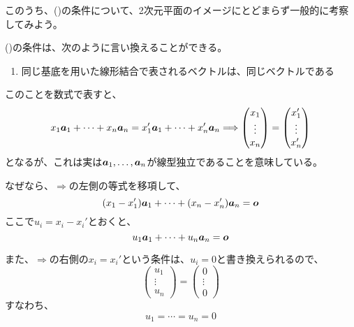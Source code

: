 \documentclass[../../../topic_linear-algebra]{subfiles}
\begin{document}
このうち、()の条件について、2次元平面のイメージにとどまらず一般的に考察してみよう。

\br

()の条件は、次のように言い換えることができる。

\begin{enumerate}[label=\romanlabel, start=2]
  \item 同じ基底を用いた線形結合で表されるベクトルは、同じベクトルである
\end{enumerate}

このことを数式で表すと、
\begin{equation*}
  x_1 \vb*{a}_1 + \cdots + x_n \vb*{a}_n = x_1' \vb*{a}_1 + \cdots + x_n' \vb*{a}_n \Longrightarrow \begin{pmatrix}
    x_1    \\
    \vdots \\
    x_n
  \end{pmatrix} = \begin{pmatrix}
    x_1'   \\
    \vdots \\
    x_n'
  \end{pmatrix}
\end{equation*}
となるが、これは実は$\vb*{a}_1,\ldots,\vb*{a}_n$が線型独立であることを意味している。

\br

なぜなら、$\Longrightarrow$の左側の等式を移項して、
\begin{equation*}
  (x_1 - x_1') \vb*{a}_1 + \cdots + (x_n - x_n') \vb*{a}_n = \vb*{o}
\end{equation*}
ここで$u_i = x_i - x_i'$とおくと、
\begin{equation*}
  u_1 \vb*{a}_1 + \cdots + u_n \vb*{a}_n = \vb*{o}
\end{equation*}

\br

また、$\Longrightarrow$の右側の$x_i = x_i'$という条件は、$u_i = 0$と書き換えられるので、
\begin{equation*}
  \begin{pmatrix}
    u_1    \\
    \vdots \\
    u_n
  \end{pmatrix} = \begin{pmatrix}
    0      \\
    \vdots \\
    0
  \end{pmatrix}
\end{equation*}
すなわち、
\begin{equation*}
  u_1 = \cdots = u_n = 0
\end{equation*}
\end{document}
